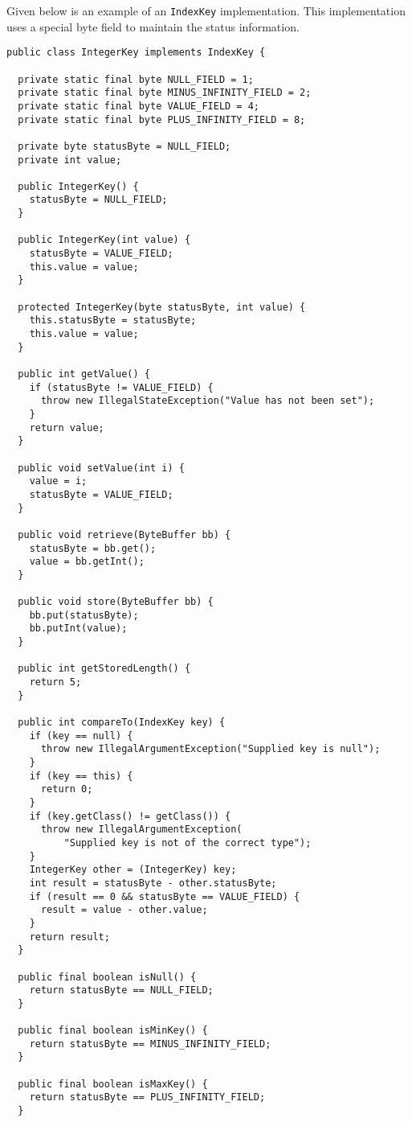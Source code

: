 \documentclass[a4paper,draft,oneside]{book}
\begin{document}
Given below is an example of an \verb|IndexKey| implementation. This 
implementation uses a special byte field to maintain the status information.

\begin{verbatim}
public class IntegerKey implements IndexKey {

  private static final byte NULL_FIELD = 1;
  private static final byte MINUS_INFINITY_FIELD = 2;
  private static final byte VALUE_FIELD = 4;
  private static final byte PLUS_INFINITY_FIELD = 8;

  private byte statusByte = NULL_FIELD;
  private int value;

  public IntegerKey() {
    statusByte = NULL_FIELD;
  }

  public IntegerKey(int value) {
    statusByte = VALUE_FIELD;
    this.value = value;
  }

  protected IntegerKey(byte statusByte, int value) {
    this.statusByte = statusByte;
    this.value = value;
  }

  public int getValue() {
    if (statusByte != VALUE_FIELD) {
      throw new IllegalStateException("Value has not been set");
    }
    return value;
  }

  public void setValue(int i) {
    value = i;
    statusByte = VALUE_FIELD;
  }

  public void retrieve(ByteBuffer bb) {
    statusByte = bb.get();
    value = bb.getInt();
  }

  public void store(ByteBuffer bb) {
    bb.put(statusByte);
    bb.putInt(value);
  }

  public int getStoredLength() {
    return 5;
  }

  public int compareTo(IndexKey key) {
    if (key == null) {
      throw new IllegalArgumentException("Supplied key is null");
    }
    if (key == this) {
      return 0;
    }
    if (key.getClass() != getClass()) {
      throw new IllegalArgumentException(
          "Supplied key is not of the correct type");
    }
    IntegerKey other = (IntegerKey) key;
    int result = statusByte - other.statusByte;
    if (result == 0 && statusByte == VALUE_FIELD) {
      result = value - other.value;
    }
    return result;
  }

  public final boolean isNull() {
    return statusByte == NULL_FIELD;
  }

  public final boolean isMinKey() {
    return statusByte == MINUS_INFINITY_FIELD;
  }

  public final boolean isMaxKey() {
    return statusByte == PLUS_INFINITY_FIELD;
  }


\end{verbatim}
\end{document}
